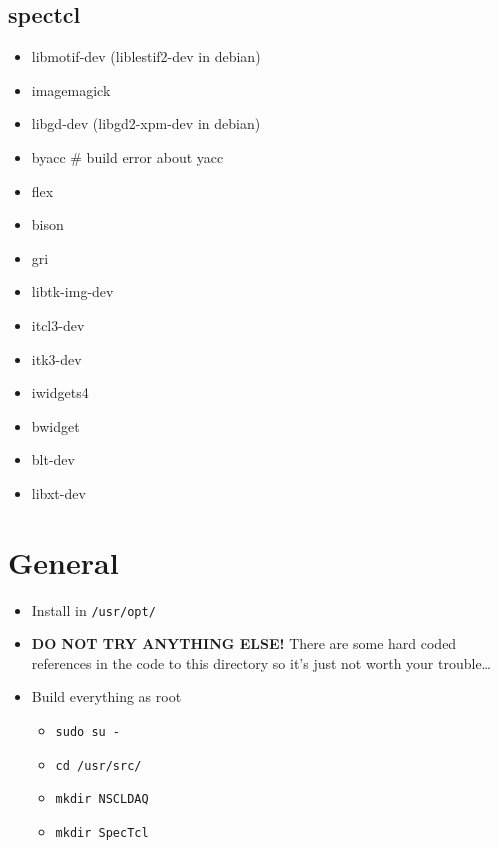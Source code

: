 \documentclass[11pt]{article}
\begin{document}
\subsection*{spectcl}
\label{sec-1-3}
\begin{itemize}
\item libmotif-dev  (liblestif2-dev in debian)
\item imagemagick
\item libgd-dev  (libgd2-xpm-dev in debian)
\item byacc           \# build error about yacc
\item flex
\item bison
\item gri
\item libtk-img-dev
\item itcl3-dev
\item itk3-dev
\item iwidgets4
\item bwidget
\item blt-dev
\item libxt-dev
\end{itemize}
\section*{General}
\label{sec-2}
\begin{itemize}
\item Install in \verb~/usr/opt/~
\item \textbf{DO NOT TRY ANYTHING ELSE!} There are some hard coded references
in the code to this directory so it's just not worth your
trouble\ldots{}
\item Build everything as root
\begin{itemize}
\item \verb~sudo su -~
\item \verb~cd /usr/src/~
\item \verb~mkdir NSCLDAQ~
\item \verb~mkdir SpecTcl~
\end{itemize}
\end{itemize}
\end{document}
